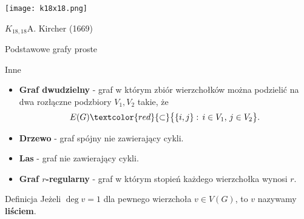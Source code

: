 \documentclass[a4paper,10pt]{beamer}
\begin{document}
\begin{frame}

\begin{center}
 \texttt{[image: k18x18.png]} \begin{minipage}[b]{5cm}
 	$K_{18,18}$\newline A. Kircher (1669) \end{minipage}
\end{center}

\end{frame}




\begin{frame}{Podstawowe grafy proste}
	\begin{block}{Inne}
		\begin{itemize}
			\item {\bf Graf dwudzielny} - graf w którym zbiór wierzchołków można podzielić na dwa rozłączne podzbiory $V_1,V_2$ takie, że
			$$E(G)\textcolor{red}{\subset}\big\{\{i,j\}:\,i\in V_1,\,j\in V_2\big\}.$$
			\item {\bf Drzewo} - graf spójny nie zawierający cykli.
			\item {\bf Las} - graf nie zawierający cykli.
			\item {\bf Graf $r$-regularny} - graf w którym stopień każdego wierzchołka wynosi $r$.
		\end{itemize}
	\end{block}

\begin{block}{Definicja}
Jeżeli $\deg v=1$ dla pewnego wierzchoła $v\in V(G)$, to $v$ nazywamy {\bf liściem}.
\end{block}
		
\end{frame}
\end{document}
